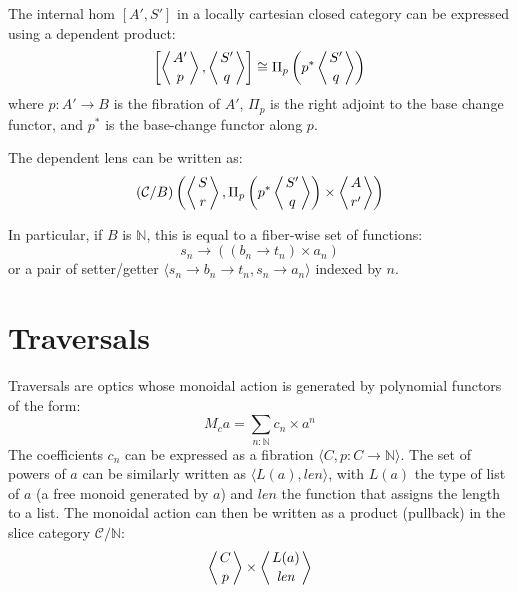 \documentclass[11pt]{amsart}
\begin{document}
The internal hom $[A', S']$ in a locally cartesian closed category can be expressed using a dependent product:
\[ \left [\left \langle A' \atop p \right \rangle, \left \langle S' \atop q \right \rangle \right ] \cong \Pi_p \left(p^* \left \langle S' \atop q \right \rangle \right)\]
where $p \colon A' \to B$ is the fibration of $A'$, $\Pi_p$ is the right adjoint to the base change functor, and $p^*$ is the base-change functor along $p$.

The dependent lens can be written as:
\[ (\mathcal{C} / B) \left( \left \langle S \atop r \right \rangle, \Pi_p \left(p^* \left \langle S' \atop q \right \rangle \right) \times \left \langle A \atop r' \right \rangle \right) \]

In particular, if $B$ is $\mathbb{N}$, this is equal to a fiber-wise set of functions:
\[s_n \to \left((b_n \to t_n) \times a_n \right) \]
or a pair of setter/getter $\langle s_n \to b_n \to t_n, s_n \to a_n \rangle$ indexed by $n$.

\section{Traversals}

Traversals are optics whose monoidal action is generated by polynomial functors of the form:
\[ M_{c} a = \sum_{n \colon \mathbb{N}} c_n \times a^n \]
The coefficients $c_n$ can be expressed as a fibration $ \langle C, p \colon C \to \mathbb{N} \rangle$. The set of powers of $a$ can be similarly written as $\langle L(a), \mathit{len} \rangle$, with $L(a)$ the type of list of $a$ (a free monoid generated by $a$) and $\mathit{len}$ the function that assigns the length to a list. The monoidal action can then be written as a product (pullback) in the slice category $\mathcal{C}/\mathbb{N}$:
\[ \left \langle {C \atop p} \right \rangle \times \left \langle {L(a) \atop \mathit{len}} \right \rangle \]
\end{document}
